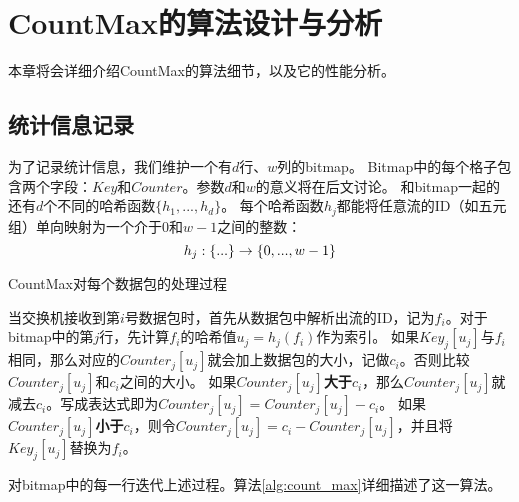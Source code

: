 \chapter{CountMax的算法设计与分析}\label{chap:countmax}
本章将会详细介绍CountMax的算法细节，以及它的性能分析。

\section{统计信息记录}

为了记录统计信息，我们维护一个有$d$行、$w$列的bitmap。
Bitmap中的每个格子包含两个字段：$Key$和$Counter$。参数$d$和$w$的意义将在后文讨论。
和bitmap一起的还有$d$个不同的哈希函数$\{h_{1},...,h_{d}\}$。
每个哈希函数$h_j$都能将任意流的ID（如五元组）单向映射为一个介于$0$和$w-1$之间的整数：
\begin{equation}
\notag h_j: \{...\} \to \{0, ..., w-1\}
\end{equation}

\begin{algorithm}[htb]
    \small
    \SetAlgoLined
  
    \caption{CountMax对每个数据包的处理过程}
    \label{alg:count_max}
\end{algorithm}
当交换机接收到第$i$号数据包时，首先从数据包中解析出流的ID，记为$f_i$。对于bitmap中的第$j$行，先计算$f_i$的哈希值$u_{j}=h_{j}(f_i)$作为索引。
如果$Key_{j}[u_{j}]$与$f_i$相同，那么对应的$Counter_{j}[u_{j}]$就会加上数据包的大小，记做$c_i$。否则比较$Counter_{j}[u_{j}]$和$c_i$之间的大小。
如果$Counter_{j}[u_{j}]$\textbf{大于}$c_i$，那么$Counter_{j}[u_{j}]$就减去$c_i$。写成表达式即为$Counter_{j}[u_{j}] = Counter_{j}[u_{j}] - c_i$。
如果$Counter_{j}[u_{j}]$\textbf{小于}$c_i$，则令$Counter_{j}[u_{j}]=c_i - Counter_{j}[u_{j}]$，并且将$Key_{j}[u_{j}]$替换为$f_i$。

对bitmap中的每一行迭代上述过程。算法\ref{alg:count_max}详细描述了这一算法。




